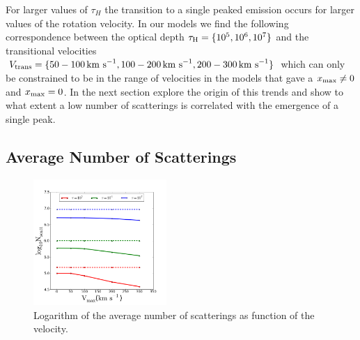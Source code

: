 \documentclass[usenatbib]{mn2e}
\newcommand{\kms}{{\ifmmode{{\mathrm{\,km\ s}^{-1}}}\else{\,km~s$^{-1}$}\fi}}
\begin{document}
For larger values of $\tau_{H}$ the transition to a single peaked
emission occurs for larger values of the rotation velocity. In our
models we find the following correspondence between the optical depth
$\tau_{\rm H}=\{10^5, 10^6, 10^7\}$ and the transitional velocities $V_{\rm
  trans}=\{50-100\kms, 100-200\kms, 200-300\kms\}$ which can only be
constrained to be in the range of velocities in the models that gave a
$x_{\rm max}\neq 0$ and $x_{\rm max}=0$.   In the next section explore the
origin of this trends and show to what extent a low number of
scatterings is correlated with the emergence of a single peak.



\subsection{Average Number of Scatterings}


\begin{figure}
    \includegraphics[width=0.45\textwidth]{NscattvsVmax.png}
\caption{Logarithm of the average number of scatterings as function of
  the velocity. \label{fig:Nscatt}}   
\end{figure}
\end{document}
